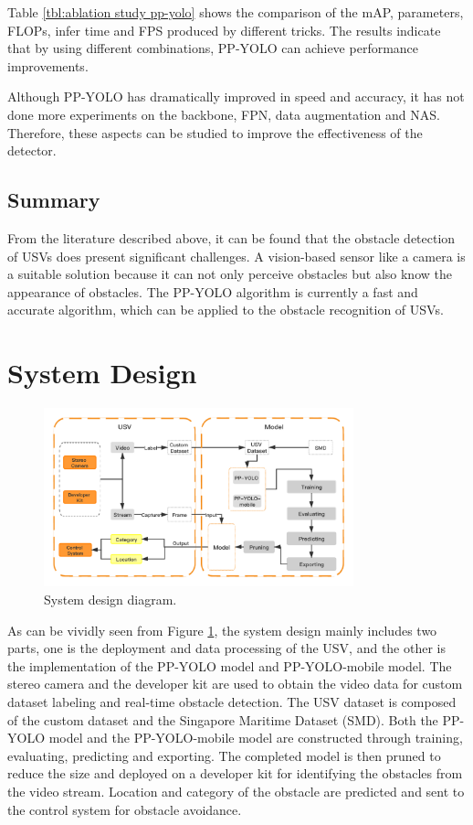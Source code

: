 \documentclass[sensors,article,submit,moreauthors,pdftex]{Definitions/mdpi}
\begin{document}
\begin{paracol}{2}
\linenumbers
\switchcolumn

Table \ref{tbl:ablation study pp-yolo} shows the comparison of the mAP, parameters, FLOPs, infer time and FPS produced by different tricks. The results indicate that by using different combinations, PP-YOLO can achieve performance improvements.

Although PP-YOLO has dramatically improved in speed and accuracy, it has not done more experiments on the backbone, FPN, data augmentation and NAS. Therefore, these aspects can be studied to improve the effectiveness of the detector.


\subsection{Summary}

From the literature described above, it can be found that the obstacle detection of USVs does present significant challenges. A vision-based sensor like a camera is a suitable solution because it can not only perceive obstacles but also know the appearance of obstacles. The PP-YOLO algorithm is currently a fast and accurate algorithm, which can be applied to the obstacle recognition of USVs. 

\section{System Design}

\begin{figure}[htbp]
\centering
\includegraphics[width=0.8\textwidth]{images/design.png}
\caption{System design diagram.}
\label{fig:system architecture}
\end{figure}

As can be vividly seen from Figure \ref{fig:system architecture}, the system design mainly includes two parts, one is the deployment and data processing of the USV, and the other is the implementation of the PP-YOLO model and  PP-YOLO-mobile model. The stereo camera and the developer kit are used to obtain the video data for custom dataset labeling and real-time obstacle detection. The USV dataset is composed of the custom dataset and the Singapore Maritime Dataset (SMD). Both the PP-YOLO model and the PP-YOLO-mobile model are constructed through training, evaluating, predicting and exporting. The completed model is then pruned to reduce the size and deployed on a developer kit for identifying the obstacles from the video stream. Location and category of the obstacle are predicted and sent to the control system for obstacle avoidance.



\end{paracol}
\end{document}
